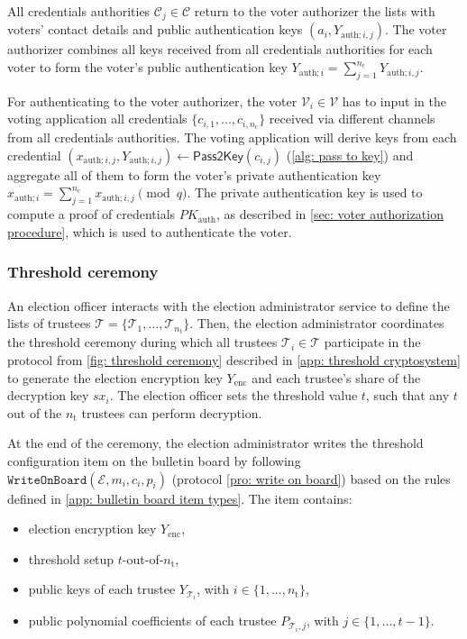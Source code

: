 All credentials authorities $\mathcal{C}_j \in \boldsymbol{\mathcal{C}}$ return to the voter authorizer the lists with voters' contact details and public authentication keys $(a_i, Y_{\mathrm{auth}; i,j})$. The voter authorizer combines all keys received from all credentials authorities for each voter to form the voter's public authentication key $Y_{\mathrm{auth}; i} = \sum_{j=1}^{n_\mathrm{c}} Y_{\mathrm{auth}; i, j}$.

For authenticating to the voter authorizer, the voter $\mathcal{V}_i \in \boldsymbol{\mathcal{V}}$ has to input in the voting application all credentials $\{ c_{i, 1}, ..., c_{i, n_\mathrm{c}} \}$ received via different channels from all credentials authorities. The voting application will derive keys from each credential $(x_{\mathrm{auth}; i, j}, Y_{\mathrm{auth}; i, j}) \gets \mathsf{Pass2Key}(c_{i, j})$ (\cref{alg: pass to key}) and aggregate all of them to form the voter's private authentication key $x_{\mathrm{auth}; i} = \sum_{j=1}^{n_\mathrm{c}} x_{\mathrm{auth}; i, j} \pmod q$. The private authentication key is used to compute a proof of credentials $PK_\mathrm{auth}$, as described in \cref{sec: voter authorization procedure}, which is used to authenticate the voter.


\subsubsection{Threshold ceremony} \label{sec: threshold ceremony}
An election officer interacts with the election administrator service to define the lists of trustees $\boldsymbol{\mathcal{T}} = \{ \mathcal{T}_1, ..., \mathcal{T}_{n_\mathrm{t}} \}$. Then, the election administrator coordinates the threshold ceremony during which all trustees $\mathcal{T}_i \in \boldsymbol{\mathcal{T}}$ participate in the protocol from \cref{fig: threshold ceremony} described in \cref{app: threshold cryptosystem} to generate the election encryption key $Y_\mathrm{enc}$ and each trustee's share of the decryption key $sx_i$. The election officer sets the threshold value $t$, such that any $t$ out of the $n_\mathrm{t}$ trustees can perform decryption.

At the end of the ceremony, the election administrator writes the threshold configuration item on the bulletin board by following $\mathtt{WriteOnBoard}(\mathcal{E}, m_i, c_i, p_i)$ (protocol \ref{pro: write on board}) based on the rules defined in \cref{app: bulletin board item types}. The item contains:
\begin{itemize}
    \item election encryption key $Y_\mathrm{enc}$,
    \item threshold setup $t$-out-of-$n_\mathrm{t}$,
    \item public keys of each trustee $Y_{\mathcal{T}_i}$, with $i \in \{1, ..., n_\mathrm{t}\}$,
    \item public polynomial coefficients of each trustee $P_{\mathcal{T}_i,j}$, with $j \in \{1, ..., t-1 \}$.
\end{itemize}


